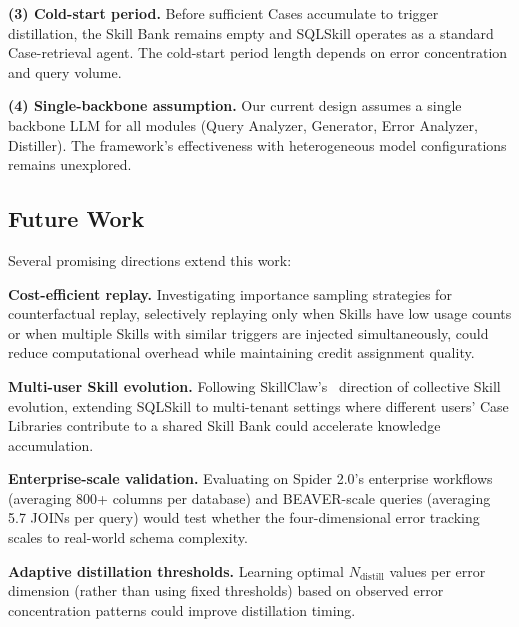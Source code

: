 \textbf{(3) Cold-start period.} Before sufficient Cases accumulate to trigger distillation, the Skill Bank remains empty and SQLSkill operates as a standard Case-retrieval agent. The cold-start period length depends on error concentration and query volume.

\textbf{(4) Single-backbone assumption.} Our current design assumes a single backbone LLM for all modules (Query Analyzer, Generator, Error Analyzer, Distiller). The framework's effectiveness with heterogeneous model configurations remains unexplored.

\subsection{Future Work}
\label{subsec:future_work}

Several promising directions extend this work:

\textbf{Cost-efficient replay.} Investigating importance sampling strategies for counterfactual replay, selectively replaying only when Skills have low usage counts or when multiple Skills with similar triggers are injected simultaneously, could reduce computational overhead while maintaining credit assignment quality.

\textbf{Multi-user Skill evolution.} Following SkillClaw's~\cite{ma2026skillclaw} direction of collective Skill evolution, extending SQLSkill to multi-tenant settings where different users' Case Libraries contribute to a shared Skill Bank could accelerate knowledge accumulation.

\textbf{Enterprise-scale validation.} Evaluating on Spider 2.0's enterprise workflows (averaging 800+ columns per database) and BEAVER-scale queries (averaging 5.7 JOINs per query) would test whether the four-dimensional error tracking scales to real-world schema complexity.

\textbf{Adaptive distillation thresholds.} Learning optimal $N_{\text{distill}}$ values per error dimension (rather than using fixed thresholds) based on observed error concentration patterns could improve distillation timing.
